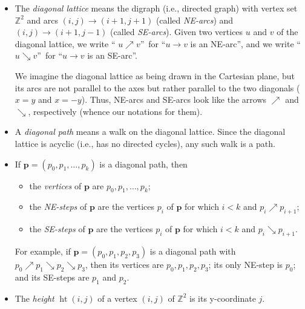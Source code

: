 \documentclass[numbers=enddot,12pt,final,onecolumn,notitlepage]{scrartcl}%
\theoremstyle{definition}
\newcommand{\ZZ}{\mathbb{Z}}
\newcommand{\pp}{\mathbf{p}}
\newcommand{\htt}{\operatorname{ht}}
\newcommand{\tup}[1]{\left( #1 \right)}
\begin{document}
\begin{itemize}

\item The \emph{diagonal lattice} means the digraph (i.e., directed graph) with vertex set
$\ZZ^2$ and arcs $\left(  i,j\right)  \to \left(
i+1,j+1\right)  $ (called \emph{NE-arcs}) and $\left(  i,j\right)
\to \left(  i+1,j-1\right)  $ (called \emph{SE-arcs}). Given two
vertices $u$ and $v$ of the diagonal lattice, we write \textquotedblleft%
$u\nearrow v$\textquotedblright\ for \textquotedblleft$u \to v$ is an
NE-arc\textquotedblright, and we  write \textquotedblleft$u\searrow
v$\textquotedblright\ for \textquotedblleft$u \to v$ is an
SE-arc\textquotedblright.

We imagine the diagonal lattice as being drawn in the Cartesian plane, but its arcs are not parallel to the axes but rather parallel to the two diagonals ($x=y$ and $x=-y$).
Thus, NE-arcs and SE-arcs look like the arrows $\nearrow$ and $\searrow$, respectively (whence our notations for them).

\item
A \emph{diagonal path} means a walk on the diagonal lattice.
Since the diagonal lattice is acyclic (i.e., has no directed cycles), any such walk is a path.

\item If $\pp=\left(  p_{0},p_{1},\ldots,p_{k}\right)  $ is a diagonal path, then

\begin{itemize}
\item the \emph{vertices} of $\pp$ are $p_{0},p_{1},\ldots,p_{k}$;

\item the \emph{NE-steps} of $\pp$ are the vertices $p_{i}$ of
$\pp$ for which $i < k$ and $p_{i}\nearrow p_{i+1}$;

\item the \emph{SE-steps} of $\pp$ are the vertices $p_{i}$ of
$\pp$ for which $i < k$ and $p_{i}\searrow p_{i+1}$.
\end{itemize}

For example, if $\pp = \tup{p_0, p_1, p_2, p_3}$ is a diagonal path with $p_0 \nearrow p_1 \searrow p_2 \searrow p_3$, then its vertices are $p_0, p_1, p_2, p_3$; its only NE-step is $p_0$; and its SE-steps are $p_1$ and $p_2$.

\item The \emph{height} $\htt\left(  i,j\right)  $ of a vertex
$\left(  i,j\right)  $ of $\ZZ^2$ is its y-coordinate $j$.


\end{itemize}
\end{document}
